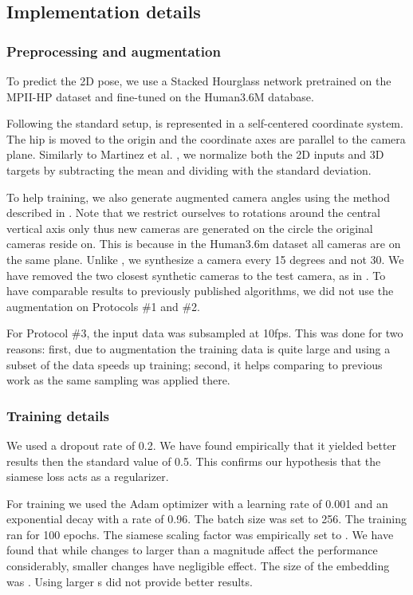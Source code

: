 \documentclass[preprint]{elsarticle}
\begin{document}
\subsection{Implementation details}

\subsubsection{Preprocessing and augmentation} 
To predict the 2D pose, we use a Stacked Hourglass network \cite{stacked_hourglass} pretrained on the MPII-HP dataset \cite{mpii-hp} and fine-tuned on the Human3.6M \cite{h36m} database.

Following the standard setup,  is represented in a self-centered coordinate system. The hip is moved to the origin and the coordinate axes are parallel to the camera plane. Similarly to Martinez et al. \cite{3dbaseline}, we normalize both the 2D inputs and 3D targets by subtracting the mean and dividing with the standard deviation. 

To help training, we also generate augmented camera angles using the me\-thod described in \cite{fang2018posegrammar}. Note that we restrict ourselves to rotations around the central vertical axis only thus new cameras are generated on the circle the original cameras reside on. This is because in the Human3.6m dataset all cameras are on the same plane. Unlike \cite{fang2018posegrammar}, we synthesize a camera every 15 degrees and not 30. We have removed the two closest synthetic cameras to the test camera, as in \cite{fang2018posegrammar}. To have comparable results to previously published algorithms, we did not use the augmentation on Protocols \#1 and \#2. 

For Protocol \#3, the input data was subsampled at 10fps. This was done for two reasons: first, due to augmentation the training data is quite large and using a subset of the data speeds up training; second, it helps comparing to previous work as the same sampling was applied there.

\subsubsection{Training details} 
We used a dropout rate of 0.2. We have found empirically that it yielded better results then the standard value of 0.5. This confirms our hypothesis that the siamese loss acts as a regularizer.

For training we used the Adam optimizer with a learning rate of 0.001 and an exponential decay with a rate of 0.96. The batch size was set to 256. The training ran for 100 epochs. The siamese scaling factor was empirically set to . We have found that while changes to  larger than a magnitude affect the performance considerably, smaller changes have negligible effect.  The size of the embedding was . Using larger s did not provide better results.
\end{document}
